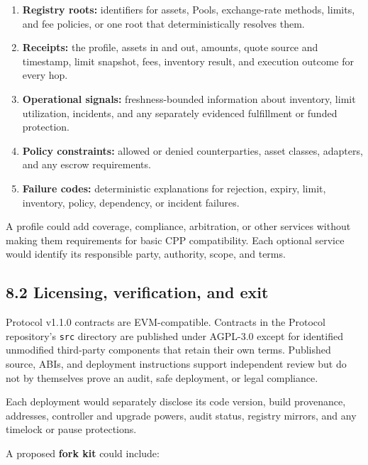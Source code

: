 \documentclass[11pt]{article}
\begin{document}
\begin{enumerate}[leftmargin=*]
\item \textbf{Registry roots:} identifiers for assets, Pools, exchange-rate methods, limits, and fee policies, or one root that deterministically resolves them.
\item \textbf{Receipts:} the profile, assets in and out, amounts, quote source and timestamp, limit snapshot, fees, inventory result, and execution outcome for every hop.
\item \textbf{Operational signals:} freshness-bounded information about inventory, limit utilization, incidents, and any separately evidenced fulfillment or funded protection.
\item \textbf{Policy constraints:} allowed or denied counterparties, asset classes, adapters, and any escrow requirements.
\item \textbf{Failure codes:} deterministic explanations for rejection, expiry, limit, inventory, policy, dependency, or incident failures.
\end{enumerate}
A profile could add coverage, compliance, arbitration, or other services without making them requirements for basic CPP compatibility. Each optional service would identify its responsible party, authority, scope, and terms.

\subsection*{8.2 Licensing, verification, and exit}

Protocol v1.1.0 contracts are EVM-compatible. Contracts in the Protocol repository's \texttt{src} directory are published under AGPL-3.0 except for identified unmodified third-party components that retain their own terms. Published source, ABIs, and deployment instructions support independent review but do not by themselves prove an audit, safe deployment, or legal compliance.

Each deployment would separately disclose its code version, build provenance, addresses, controller and upgrade powers, audit status, registry mirrors, and any timelock or pause protections.

A proposed \textbf{fork kit} could include:
\end{document}
